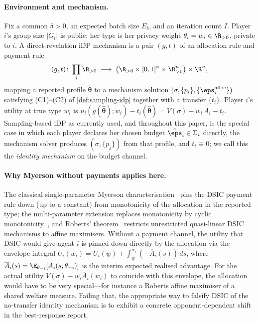 \paragraph{Environment and mechanism.}
Fix a common $\delta > 0$, an expected batch size $E_b$, and an
iteration count $I$. Player $i$'s group size $|G_i|$ is public; her
type is her privacy weight $\theta_i = w_i \in \R_{>0}$, private to $i$.
A direct-revelation iDP mechanism is a pair $(g, t)$ of an allocation
rule and payment rule
\[
(g, t)\colon \prod_i \R_{>0}
\;\longrightarrow\;
\bigl(\R_{>0} \times [0,1]^n \times \R_{>0}^n\bigr) \times \R^n,
\]
mapping a reported profile $\hat{\boldsymbol\theta}$ to a mechanism
solution $(\sigma, \{p_i\}, \{\eps_i^{\mathrm{alloc}}\})$ satisfying
\textup{(C1)--(C2)} of \cref{def:sampling-idp} together with a transfer
$\{t_i\}$. Player $i$'s utility at true type $w_i$ is
$u_i(g(\hat{\boldsymbol\theta}); w_i) - t_i(\hat{\boldsymbol\theta}) =
V(\sigma) - w_i\, A_i - t_i$. Sampling-based iDP as currently used, and
throughout this paper, is the special case in which each player declares
her chosen budget $\hat\eps_i \in \Sigma_i$ directly, the mechanism
solver produces $(\sigma, \{p_j\})$ from that profile, and
$t_i \equiv 0$; we call this the \emph{identity mechanism} on the
budget channel.

\paragraph{Why Myerson without payments applies here.}
The classical single-parameter Myerson
characterisation~\cite{myerson1981optimal} pins the DSIC payment rule
down (up to a constant) from monotonicity of the allocation in the
reported type; the multi-parameter extension replaces monotonicity by
cyclic monotonicity~\cite{rochet1987necessary}, and Roberts'
theorem~\cite{roberts1979characterization} restricts unrestricted
quasi-linear DSIC mechanisms to affine maximisers. Without a payment
channel, the utility that DSIC would give agent $i$ is pinned down
directly by the allocation via the envelope integral $U_i(w_i) =
U_i(\underline{w}) + \int_{\underline{w}}^{w_i}(-\overline{A}_i(s))\,ds$,
where $\overline{A}_i(s) = \E_{\theta_{-i}}[A_i(s, \theta_{-i})]$ is
the interim expected realised advantage. For the actual utility
$V(\sigma) - w_i \overline{A}_i(w_i)$ to coincide with this envelope,
the allocation would have to be very special---for instance a Roberts
affine maximiser of a shared welfare measure. Failing that, the
appropriate way to falsify DSIC of the no-transfer identity mechanism is
to exhibit a concrete opponent-dependent shift in the best-response
report.

